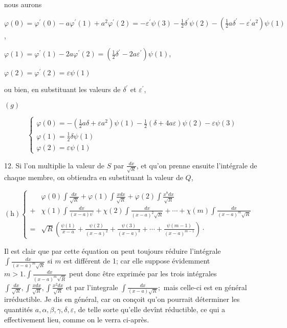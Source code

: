 \documentclass{article}
\begin{document}
nous aurons

\(\varphi(0)=\varphi^{\prime}(0)-a \varphi^{\prime}(1)+a^{2} \varphi^{\prime}(2)=-\varepsilon^{\prime} \psi(3)-\frac{1}{2} \delta^{\prime} \psi(2)-\left(\frac{1}{2} a \delta^{\prime}-\varepsilon^{\prime} a^{2}\right) \psi(1)\),

\(\varphi(1)=\varphi^{\prime}(1)-2 a \varphi^{\prime}(2)=\left(\frac{1}{2} \delta^{\prime}-2 a \varepsilon^{\prime}\right) \psi(1)\),

\(\varphi(2)=\varphi^{\prime}(2)=\varepsilon \psi(1)\)

ou bien, en substituant les valeurs de \(\delta^{\prime}\) et \(\varepsilon^{\prime}\),

\((g)\)

\[
\left\{\begin{array}{l}
\varphi(0)=-\left(\frac{1}{2} a \delta+\varepsilon a^{2}\right) \psi(1)-\frac{1}{2}(\delta+4 a \varepsilon) \psi(2)-\varepsilon \psi(3) \\
\varphi(1)=\frac{1}{2} \delta \psi(1) \\
\varphi(2)=\varepsilon \psi(1)
\end{array}\right.
\]

12. Si l'on multiplie la valeur de \(S\) par \(\frac{d x}{\sqrt{R}}\), et qu'on prenne ensuite l'intégrale de chaque membre, on obtiendra en substituant la valeur de \(Q\),

\((\mathrm{h})\left\{\begin{aligned} & \varphi(0) \int \frac{d x}{\sqrt{R}}+\varphi(1) \int \frac{x d x}{\sqrt{R}}+\varphi(2) \int \frac{x^{8} d x}{\sqrt{R}} \\ + & \chi(1) \int \frac{d x}{(x-a) v^{\prime}}+\chi(2) \int \frac{d x}{(x-a)^{2} \sqrt{R}}+\cdots+\chi(m) \int \frac{d x}{(x-a)^{m} \sqrt{R}} \\ = & \sqrt{R}\left(\frac{\psi(1)}{x-a}+\frac{\psi(2)}{(x-a)^{2}}+\frac{\psi(3)}{(x-a)^{3}}+\cdots+\frac{\psi(m-1)}{(x-a)^{m-1}}\right) \cdot\end{aligned}\right.\)

Il est clair que par cette équation on peut toujours réduire l'intégrale \(\int \frac{d x}{(x-a)^{m} \sqrt{R}}\) si \(m\) est différent de 1; car elle suppose évidemment \(m>1 . \int \frac{d x}{(x-a)^{m} \sqrt{\bar{R}}}\) peut donc être exprimée par les trois intégrales \(\int \frac{d x}{\sqrt{R}}, \int \frac{x d x}{\sqrt{R}}, \int \frac{x^{2} d x}{\sqrt{R}}\) et par l'integrale \(\int \frac{d x}{(x-a) \sqrt{R}} ;\) mais celle-ci est en général irréductible. Je dis en général, car on conçoit qu'on pourrait déterminer les quantités \(a, \alpha, \beta, \gamma, \delta, \varepsilon\), de telle sorte qu'elle devînt réductible, ce qui a effectivement lieu, comme on le verra ci-après.
\end{document}
